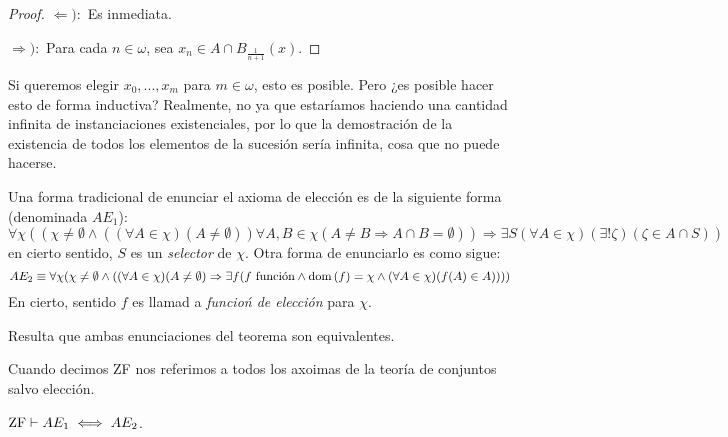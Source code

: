 \documentclass[12pt]{report}
\newcounter{it}
\theoremstyle{largebreak}
\newcommand\dom[1]{\ensuremath{\textup{dom}\left(#1\right)}}
\begin{document}
    \begin{proof}
        $\Leftarrow):$ Es inmediata.

        $\Rightarrow):$ Para cada $n\in\omega$, sea $x_n\in A\cap B_{\frac{1}{n+1}}(x)$.
    \end{proof}

    Si queremos elegir $x_0,...,x_m$ para $m\in\omega$, esto es posible. Pero ¿es posible hacer esto de forma inductiva? Realmente, no ya que estaríamos haciendo una cantidad infinita de instanciaciones existenciales, por lo que la demostración de la existencia de todos los elementos de la sucesión sería infinita, cosa que no puede hacerse.

    Una forma tradicional de enunciar el axioma de elección es de la siguiente forma (denominada $AE_1$):
    \begin{equation*}
        \forall\chi((\chi\neq\emptyset\land((\forall A\in\chi)(A\neq\emptyset))\forall A,B\in\chi(A\neq B\Rightarrow A\cap B=\emptyset))\Rightarrow\exists S(\forall A\in\chi)(\exists!\zeta)(\zeta\in A\cap S))
    \end{equation*}
    en cierto sentido, $S$ es un \textit{selector} de $\chi$. Otra forma de enunciarlo es como sigue:
    \begin{equation*}
        AE_2\equiv\forall\chi(\chi\neq\emptyset\land((\forall A\in\chi)(A\neq\emptyset)\Rightarrow\exists f(f\textup{ función}\land\dom{f}=\chi\land(\forall A\in\chi)(f(A)\in A))))        
    \end{equation*}
    En cierto, sentido $f$ es llamad a \textit{funcioń de elección} para $\chi$.

    Resulta que ambas enunciaciones del teorema son equivalentes.

    \begin{obs}
        Cuando decimos ZF nos referimos a todos los axoimas de la teoría de conjuntos salvo elección.
    \end{obs}

    \begin{theor}
        $\textup{ZF}\vdash AE_1\iff AE_2$.
    \end{theor}
\end{document}
